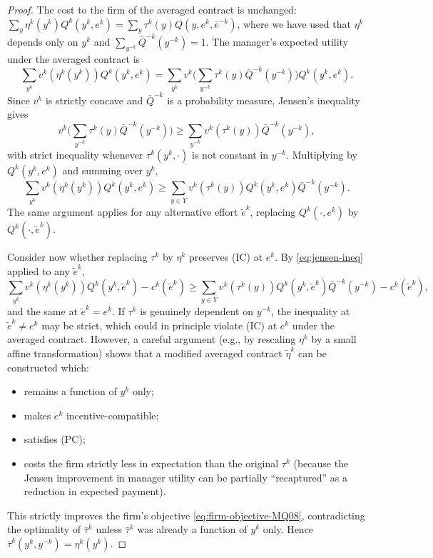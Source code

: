 \documentclass[11pt,a4paper,oneside]{book}
\def\geq{\geqslant}
\theoremstyle{plain}
\theoremstyle{definition}
\theoremstyle{remark}
\numberwithin{equation}{chapter}
\begin{document}
\begin{proof}
The cost to the firm of the averaged contract is unchanged: $\sum_{y} \eta^k(y^k) Q^k(y^k, e^k) = \sum_{y} \tau^k(y) Q(y, e^k, \bar{e}^{-k})$, where we have used that $\eta^k$ depends only on $y^k$ and $\sum_{y^{-k}} \bar{Q}^{-k}(y^{-k}) = 1$.
The manager's expected utility under the averaged contract is
\begin{equation*}
  \sum_{y^k} v^k(\eta^k(y^k)) Q^k(y^k, e^k)
  = \sum_{y^k} v^k\bigl( \sum_{y^{-k}} \tau^k(y) \bar{Q}^{-k}(y^{-k}) \bigr) Q^k(y^k, e^k).
\end{equation*}
Since $v^k$ is strictly concave and $\bar{Q}^{-k}$ is a probability measure, Jensen's inequality gives
\begin{equation*}
  v^k\bigl( \sum_{y^{-k}} \tau^k(y) \bar{Q}^{-k}(y^{-k}) \bigr)
  \geq \sum_{y^{-k}} v^k(\tau^k(y)) \bar{Q}^{-k}(y^{-k}),
\end{equation*}
with strict inequality whenever $\tau^k(y^k, \cdot)$ is not constant in $y^{-k}$.
Multiplying by $Q^k(y^k, e^k)$ and summing over $y^k$,
\begin{equation}\label{eq:jensen-ineq}
  \sum_{y^k} v^k(\eta^k(y^k)) Q^k(y^k, e^k)
  \geq \sum_{y \in Y} v^k(\tau^k(y)) Q^k(y^k, e^k) \bar{Q}^{-k}(y^{-k}).
\end{equation}
The same argument applies for any alternative effort $\widetilde{e}^k$, replacing $Q^k(\cdot, e^k)$ by $Q^k(\cdot, \widetilde{e}^k)$.

Consider now whether replacing $\tau^k$ by $\eta^k$ preserves (IC) at $e^k$.
By \eqref{eq:jensen-ineq} applied to any $\widetilde{e}^k$,
\begin{equation*}
  \sum_{y^k} v^k(\eta^k(y^k)) Q^k(y^k, \widetilde{e}^k) - c^k(\widetilde{e}^k)
  \geq \sum_{y \in Y} v^k(\tau^k(y)) Q^k(y^k, \widetilde{e}^k) \bar{Q}^{-k}(y^{-k}) - c^k(\widetilde{e}^k),
\end{equation*}
and the same at $\widetilde{e}^k = e^k$.
If $\tau^k$ is genuinely dependent on $y^{-k}$, the inequality at $\widetilde{e}^k \neq e^k$ may be strict, which could in principle violate (IC) at $e^k$ under the averaged contract.
However, a careful argument (e.g., by rescaling $\eta^k$ by a small affine transformation) shows that a modified averaged contract $\widetilde{\eta}^k$ can be constructed which:
\begin{itemize}
  \item remains a function of $y^k$ only;
  \item makes $e^k$ incentive-compatible;
  \item satisfies (PC);
  \item costs the firm strictly less in expectation than the original $\tau^k$ (because the Jensen improvement in manager utility can be partially ``recaptured'' as a reduction in expected payment).
\end{itemize}
This strictly improves the firm's objective \eqref{eq:firm-objective-MQ08}, contradicting the optimality of $\bar{\tau}^k$ unless $\bar{\tau}^k$ was already a function of $y^k$ only.
Hence $\bar{\tau}^k(y^k, y^{-k}) = \eta^k(y^k)$.
\end{proof}
\end{document}
